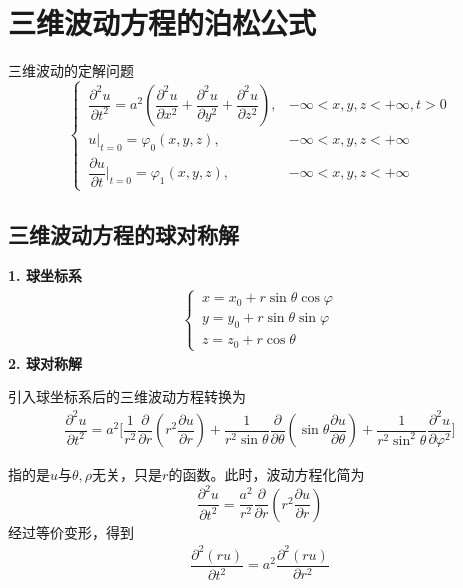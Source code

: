 \section{三维波动方程的泊松公式}
三维波动的定解问题
\begin{equation}
	\begin{cases}
		\, \dfrac{\partial^2 u}{\partial t^2} = a^2 \left(\dfrac{\partial^2 u}{\partial x^2} + \dfrac{\partial^2 u}{\partial y^2} + \dfrac{\partial^2 u}{\partial z^2}\right), & -\infty < x,y,z<+\infty, t>0\\[0.5em]
		\, u\Big|_{t = 0} = \varphi_0 (x,y,z) , & -\infty < x,y,z<+\infty \\[0.7em]
		\, \dfrac{\partial u}{\partial t}\Bigg|_{t = 0} = \varphi_1(x,y,z), & -\infty < x,y,z<+\infty
	\end{cases}
\end{equation}

\subsection{三维波动方程的球对称解}
\noindent \textbf{1. 球坐标系}
	\begin{align}
		\begin{cases}
			\, x = x_0 + r \sin \theta \cos \varphi \\
			\, y = y_0 + r \sin \theta \sin \varphi \\
			\, z = z_0 + r \cos \theta
		\end{cases}
	\end{align}
\noindent \textbf{2. 球对称解}

	引入球坐标系后的三维波动方程转换为
	\begin{align}
		\dfrac{\partial^2 u}{\partial t^2} = a^2 \Bigg[\dfrac{1}{r^2} \dfrac{\partial }{\partial r}\left(r^2 \dfrac{\partial u}{\partial r} \right)+ \dfrac{1}{r^2 \sin \theta} \dfrac{\partial }{\partial \theta} \left(\sin \theta \dfrac{\partial u}{\partial \theta} \right)+ \dfrac{1}{r^2 \sin^2 \theta} \dfrac{\partial^2 u}{\partial \varphi^2}\Bigg]
	\end{align}

	指的是$u$与$\theta,\rho$无关，只是$r$的函数。此时，波动方程化简为
	\begin{equation}
		\dfrac{\partial^2 u}{\partial t^2} = \dfrac{a^2}{r^2}\dfrac{\partial }{\partial r} \left(r^2 \dfrac{\partial u}{\partial r}\right)
	\end{equation}
	经过等价变形，得到
	\begin{align}
		\dfrac{\partial^2(ru)}{\partial t^2} = a^2 \dfrac{\partial^2(ru)}{\partial r^2}
	\end{align}

